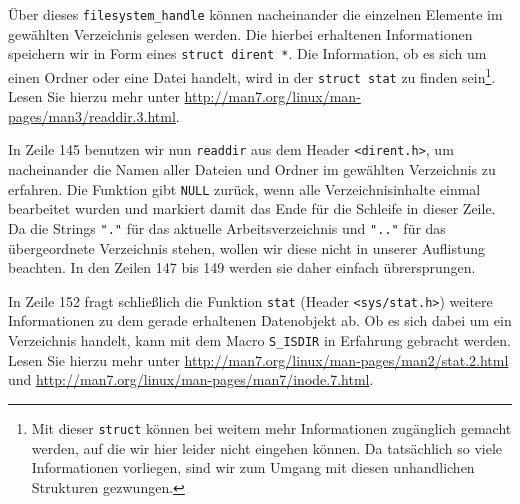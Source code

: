 Über dieses \texttt{filesystem\_handle} können nacheinander die einzelnen Elemente im gewählten Verzeichnis gelesen werden. Die hierbei erhaltenen Informationen speichern wir in Form eines \texttt{struct dirent *}. Die Information, ob es sich um einen Ordner oder eine Datei handelt, wird in der \texttt{struct stat} zu finden sein\footnote{Mit dieser \texttt{struct} können bei weitem mehr Informationen zugänglich gemacht werden, auf die wir hier leider nicht eingehen können. Da tatsächlich so viele Informationen vorliegen, sind wir zum Umgang mit diesen unhandlichen Strukturen gezwungen.}. Lesen Sie hierzu mehr unter \url{http://man7.org/linux/man-pages/man3/readdir.3.html}.

In Zeile 145 benutzen wir nun \texttt{readdir} aus dem Header \texttt{<dirent.h>}, um nacheinander die Namen aller Dateien und Ordner im gewählten Verzeichnis zu erfahren. Die Funktion gibt \texttt{NULL} zurück, wenn alle Verzeichnisinhalte einmal bearbeitet wurden und markiert damit das Ende für die Schleife in dieser Zeile. Da die Strings \texttt{"."} für das aktuelle Arbeitsverzeichnis und \texttt{".."} für das übergeordnete Verzeichnis stehen, wollen wir diese nicht in unserer Auflistung beachten. In den Zeilen 147 bis 149 werden sie daher einfach übrersprungen.

In Zeile 152 fragt schließlich die Funktion \texttt{stat} (Header \texttt{<sys/stat.h>}) weitere Informationen zu dem gerade erhaltenen Datenobjekt ab. Ob es sich dabei um ein Verzeichnis handelt, kann mit dem Macro \texttt{S\_ISDIR} in Erfahrung gebracht werden. Lesen Sie hierzu mehr unter \url{http://man7.org/linux/man-pages/man2/stat.2.html} und \url{http://man7.org/linux/man-pages/man7/inode.7.html}.
